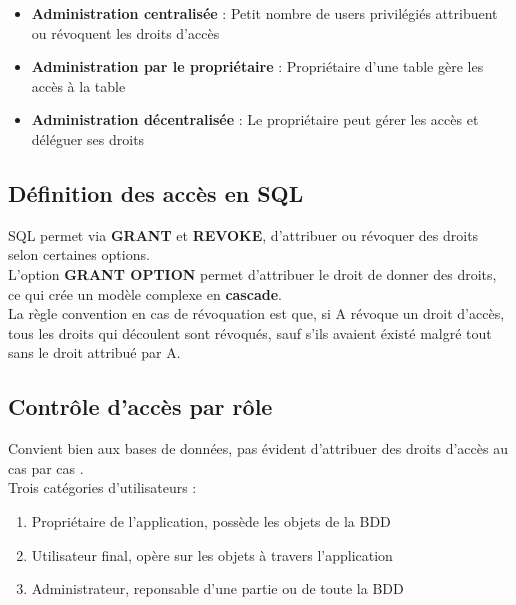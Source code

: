 \documentclass{report}
\begin{document}
		\begin{itemize}
			\item \textbf{Administration centralisée} : Petit nombre de users privilégiés attribuent ou révoquent les droits d'accès
			\item \textbf{Administration par le propriétaire} : Propriétaire d'une table gère les accès à la table
			\item \textbf{Administration décentralisée} : Le propriétaire peut gérer les accès et déléguer ses droits\\
		\end{itemize}

		\subsection{Définition des accès en SQL}

			SQL permet via \textbf{GRANT} et \textbf{REVOKE}, d'attribuer ou révoquer des droits selon certaines options.\\

			L'option \textbf{GRANT OPTION} permet d'attribuer le droit de donner des droits, ce qui crée un modèle complexe en \textbf{cascade}.\\
			La règle convention en cas de révoquation est que, si A révoque un droit d'accès, tous les droits qui découlent sont révoqués, sauf s'ils avaient éxisté malgré tout sans le droit attribué par A.\\

		\subsection{Contrôle d'accès par rôle}

			Convient bien aux bases de données, pas évident d'attribuer des droits d'accès au cas par cas .\\

			Trois catégories d'utilisateurs : \\

			\begin{enumerate}
				\item Propriétaire de l'application, possède les objets de la BDD
				\item Utilisateur final, opère sur les objets à travers l'application
				\item Administrateur, reponsable d'une partie ou de toute la BDD\\
			\end{enumerate}
\end{document}
